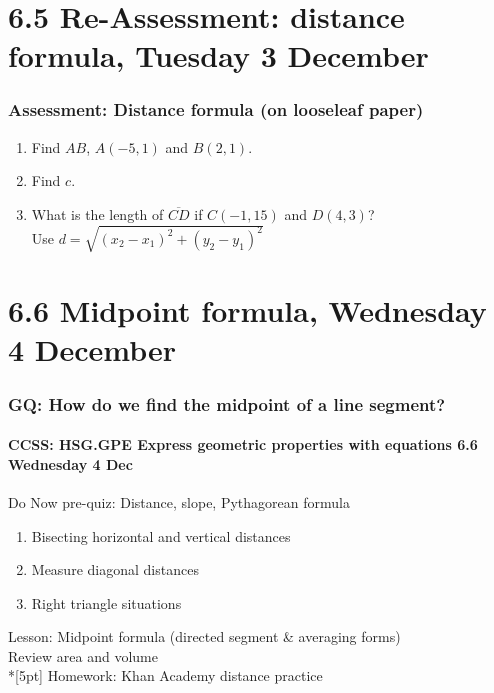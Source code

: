 \documentclass{beamer}
\begin{document}
\section{6.5 Re-Assessment: distance formula, Tuesday 3 December}
\frame
{
  \frametitle{Assessment: Distance formula (on looseleaf paper)}
  \begin{enumerate}
    \item Find $AB$, $A(-5,1)$ and $B(2,1)$. \hspace{0.5cm}
       \vspace{1cm}
    \item Find $c$. \hspace{2cm}
       \vspace{0.5cm}
    \item What is the length of $\overline{CD}$ if $C(-1,15)$ and $D(4,3)$?\\[0.5cm]
      Use $\displaystyle d=\sqrt{(x_2-x_1)^2+(y_2-y_1)^2}$
  \end{enumerate}
}

\section{6.6 Midpoint formula, Wednesday 4 December}
\frame
{
  \frametitle{GQ: How do we find the midpoint of a line segment?}
  \framesubtitle{CCSS: HSG.GPE Express geometric properties with equations \hfill \alert{6.6 Wednesday 4 Dec}}

  \begin{block}{Do Now pre-quiz: Distance, slope, Pythagorean formula}
  \begin{enumerate}
    \item Bisecting horizontal and vertical distances
    \item Measure diagonal distances
    \item Right triangle situations
  \end{enumerate}
  \end{block}
  Lesson: Midpoint formula (directed segment \& averaging forms)\\
  Review area and volume \\*[5pt]
  Homework: Khan Academy distance practice
}
\end{document}
